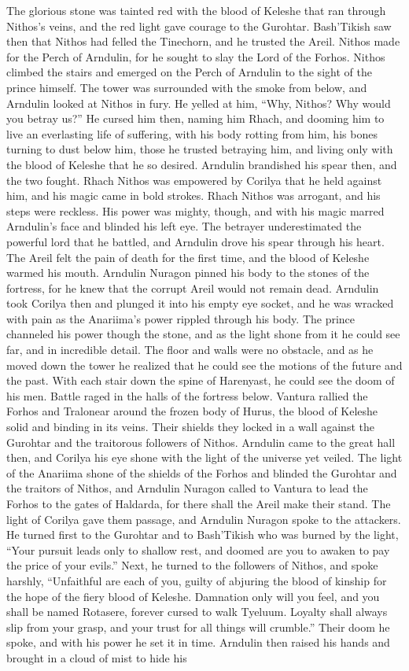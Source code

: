 \documentclass[smalldemyvopaper,11pt,twoside,onecolumn,openright,extrafontsizes]{memoir}
\begin{document}
{{The glorious stone was tainted red with the blood of Keleshe that ran through Nithos’s veins, and the red light gave courage to the Gurohtar. Bash’Tikish saw then that Nithos had felled the Tinechorn, and he trusted the Areil. Nithos made for the Perch of Arndulin, for he sought to slay the Lord of the Forhos. Nithos climbed the stairs and emerged on the Perch of Arndulin to the sight of the prince himself. The tower was surrounded with the smoke from below, and Arndulin looked at Nithos in fury. He yelled at him, “Why, Nithos? Why would you betray us?” He cursed him then, naming him Rhach, and dooming him to live an everlasting life of suffering, with his body rotting from him, his bones turning to dust below him, those he trusted betraying him, and living only with the blood of Keleshe that he so desired. Arndulin brandished his spear then, and the two fought. Rhach Nithos was empowered by Corilya that he held against him, and his magic came in bold strokes. Rhach Nithos was arrogant, and his steps were reckless. His power was mighty, though, and with his magic marred Arndulin’s face and blinded his left eye. The betrayer underestimated the powerful lord that he battled, and Arndulin drove his spear through his heart. The Areil felt the pain of death for the first time, and the blood of Keleshe warmed his mouth. Arndulin Nuragon pinned his body to the stones of the fortress, for he knew that the corrupt Areil would not remain dead. Arndulin took Corilya then and plunged it into his empty eye socket, and he was wracked with pain as the Anariima’s power rippled through his body. The prince channeled his power though the stone, and as the light shone from it he could see far, and in incredible detail. The floor and walls were no obstacle, and as he moved down the tower he realized that he could see the motions of the future and the past. With each stair down the spine of Harenyast, he could see the doom of his men. Battle raged in the halls of the fortress below. Vantura rallied the Forhos and Tralonear around the frozen body of Hurus, the blood of Keleshe solid and binding in its veins. Their shields they locked in a wall against the Gurohtar and the traitorous followers of Nithos. Arndulin came to the great hall then, and Corilya his eye shone with the light of the universe yet veiled. The light of the Anariima shone of the shields of the Forhos and blinded the Gurohtar and the traitors of Nithos, and Arndulin Nuragon called to Vantura to lead the Forhos to the gates of Haldarda, for there shall the Areil make their stand. The light of Corilya gave them passage, and Arndulin Nuragon spoke to the attackers. He turned first to the Gurohtar and to Bash’Tikish who was burned by the light, “Your pursuit leads only to shallow rest, and doomed are you to awaken to pay the price of your evils.” Next, he turned to the followers of Nithos, and spoke harshly, “Unfaithful are each of you, guilty of abjuring the blood of kinship for the hope of the fiery blood of Keleshe. Damnation only will you feel, and you shall be named Rotasere, forever cursed to walk Tyeluum. Loyalty shall always slip from your grasp, and your trust for all things will crumble.” Their doom he spoke, and with his power he set it in time. Arndulin then raised his hands and brought in a cloud of mist to hide his }}
\end{document}
